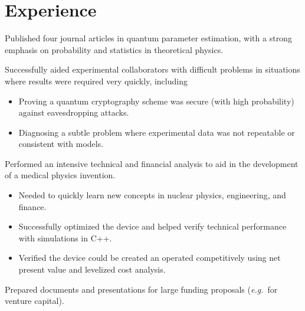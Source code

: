 \documentclass[]{deedy-resume-openfont}
\begin{document}
\hfill
\begin{minipage}[t]{0.66\textwidth} 


\section{Experience}
\vspace{\topsep}
\begin{tightemize}
\item Published four journal articles in quantum parameter estimation, with a strong emphasis on probability and statistics in theoretical physics.
\item Successfully aided experimental collaborators with difficult problems in situations where results were required very quickly, including
  \begin{itemize}
  \item Proving a quantum cryptography scheme was secure (with high probability) against eavesdropping attacks.
  \item Diagnosing a subtle problem where experimental data was not repeatable or consistent with models.
  \end{itemize}
  
\end{tightemize}
\sectionsep
{}
\begin{tightemize}
\item Performed an intensive technical and financial analysis to aid in the development of a medical physics invention.
  \begin{itemize}
  \item Needed to quickly learn new concepts in nuclear physics, engineering, and finance.
  \item Successfully optimized the device and helped verify technical performance with simulations in C++.
  \item Verified the device could be created an operated competitively using net present value and levelized cost analysis.
  \end{itemize}
\item Prepared documents and presentations for large funding proposals (\emph{e.g.}~for venture capital).
\end{tightemize}
\sectionsep


\end{minipage}
\end{document}
